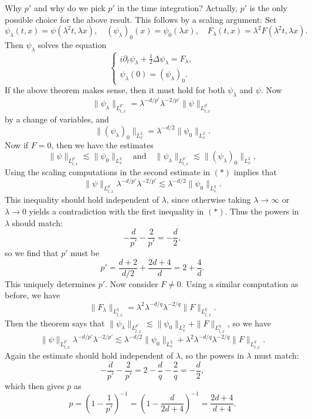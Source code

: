 \begin{remark}
  Why $p'$ and why do we pick $p'$ in the time
  integration? Actually, $p'$ is the only possible
  choice for the above result. This follows by a
  scaling argument: Set
  \[
    \psi_\lambda(t, x) = \psi(\lambda^2 t, \lambda x),
    \quad
    (\psi_\lambda)_0(x) = \psi_0(\lambda x),
    \quad
    F_\lambda(t, x) = \lambda^2 F(\lambda^2 t, \lambda x).
  \]
  Then $\psi_\lambda$ solves the equation
  \[
    \begin{cases}
    i \partial_t \psi_\lambda + \frac{1}{2} \Delta \psi_\lambda = F_\lambda, \\
    \psi_\lambda(0) = (\psi_{\lambda})_0.
    \end{cases}
  \]
  If the above theorem makes sense, then it must hold
  for both $\psi_\lambda$ and $\psi$. Now
  \[
    \|\psi_\lambda\|_{L^{p'}_{t, x}}
    = \lambda^{-d / p'} \lambda^{-2 / p'} \|\psi\|_{L^{p'}_{t, x}}
  \]
  by a change of variables, and
  \[
    \|(\psi_\lambda)_0\|_{L^2_x}
    = \lambda^{-d / 2} \|\psi_0\|_{L^2_x}.
  \]
  Now if $F = 0$, then we have the estimates
  \[
    \|\psi\|_{L^{p'}_{t, x}} \lesssim \|\psi_0\|_{L^2_x}
    \quad \text{and} \quad
    \|\psi_\lambda\|_{L^{p'}_{t, x}}
    \lesssim \|(\psi_\lambda)_0\|_{L^2_x}, \tag{$*$}
  \]
  Using the scaling computations in the second estimate
  in $(*)$ implies that
  \[
    \| \psi \|_{L^{p'}_{t, x}} \lambda^{-d / p'} \lambda^{-2 / p'}
    \lesssim \lambda^{-d / 2} \|\psi_0\|_{L^2_x}.
  \]
  This inequality should hold independent of $\lambda$,
  since otherwise taking $\lambda \to \infty$ or
  $\lambda \to 0$ yields a contradiction with the
  first inequality in $(*)$.
  Thus the powers in $\lambda$ should match:
  \[
    -\frac{d}{p'} - \frac{2}{p'} = -\frac{d}{2},
  \]
  so we find that $p'$ must be
  \[
    p' = \frac{d + 2}{d / 2} + \frac{2d + 4}{d} = 2 + \frac{4}{d}.
  \]
  This uniquely determines $p'$. Now consider $F \ne 0$.
  Using a similar computation as before, we have
  \[
    \|F_\lambda\|_{L^q_{t, x}} = \lambda^2 \lambda^{-d / q} \lambda^{-2 / q} \|F\|_{L^q_{t, x}}.
  \]
  Then the theorem says that
  $\|\psi_\lambda\|_{L^{p'}_{t, x}} \lesssim \|\psi_0\|_{L^2_x} + \|F\|_{L^q_{t, x}}$,
  so we have
  \[
    \|\psi\|_{L^{p'}_{t, x}} \lambda^{-d / p'} \lambda^{-2 / p'}
    \lesssim \lambda^{-d / 2} \| \psi_0 \|_{L^2_x} + \lambda^2 \lambda^{-d / q} \lambda^{-2 / q} \|F\|_{L^q_{t, x}}.
  \]
  Again the estimate should hold independent of
  $\lambda$, so the powers in $\lambda$ must match:
  \[
    -\frac{d}{p'} - \frac{2}{p'} = 2 - \frac{d}{q} - \frac{2}{q} = -\frac{d}{2},
  \]
  which then gives $p$ as
  \[
    p = \left(1 - \frac{1}{p'}\right)^{-1} = \left(1 - \frac{d}{2d + 4}\right)^{-1} = \frac{2d + 4}{d + 4}.
  \]
\end{remark}

